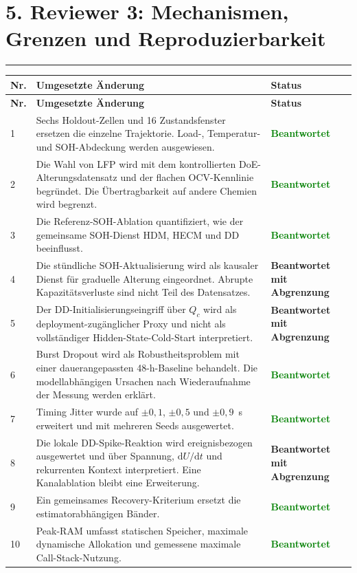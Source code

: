 \documentclass[10pt,a4paper]{article}
\newcommand{\statusdone}{\textcolor{green}{\textbf{Beantwortet}}}
\newcommand{\statusscope}{\textcolor{tured}{\textbf{Beantwortet mit Abgrenzung}}}
\newcommand{\sectionrule}{\vspace{-2pt}\color{tured}\rule{\textwidth}{0.7pt}\color{black}\vspace{2pt}}
\begin{document}
\section*{5. Reviewer 3: Mechanismen, Grenzen und Reproduzierbarkeit}
\sectionrule

\small
\begin{longtable}{P{0.8cm}P{10.5cm}P{3.4cm}}
\toprule
\textbf{Nr.} & \textbf{Umgesetzte Änderung} & \textbf{Status} \\
\midrule
\endfirsthead
\toprule
\textbf{Nr.} & \textbf{Umgesetzte Änderung} & \textbf{Status} \\
\midrule
{} & Sechs Holdout-Zellen und 16 Zustandsfenster ersetzen die einzelne Trajektorie. Load-, Temperatur- und SOH-Abdeckung werden ausgewiesen. & \statusdone \\
2 & Die Wahl von LFP wird mit dem kontrollierten DoE-Alterungsdatensatz und der flachen OCV-Kennlinie begründet. Die Übertragbarkeit auf andere Chemien wird begrenzt. & \statusdone \\
3 & Die Referenz-SOH-Ablation quantifiziert, wie der gemeinsame SOH-Dienst HDM, HECM und DD beeinflusst. & \statusdone \\
4 & Die stündliche SOH-Aktualisierung wird als kausaler Dienst für graduelle Alterung eingeordnet. Abrupte Kapazitätsverluste sind nicht Teil des Datensatzes. & \statusscope \\
5 & Der DD-Initialisierungseingriff über $Q_c$ wird als deployment-zugänglicher Proxy und nicht als vollständiger Hidden-State-Cold-Start interpretiert. & \statusscope \\
6 & Burst Dropout wird als Robustheitsproblem mit einer dauerangepassten 48-h-Baseline behandelt. Die modellabhängigen Ursachen nach Wiederaufnahme der Messung werden erklärt. & \statusdone \\
7 & Timing Jitter wurde auf $\pm0{,}1$, $\pm0{,}5$ und $\pm0{,}9$~s erweitert und mit mehreren Seeds ausgewertet. & \statusdone \\
8 & Die lokale DD-Spike-Reaktion wird ereignisbezogen ausgewertet und über Spannung, $\mathrm{d}U/\mathrm{d}t$ und rekurrenten Kontext interpretiert. Eine Kanalablation bleibt eine Erweiterung. & \statusscope \\
9 & Ein gemeinsames Recovery-Kriterium ersetzt die estimatorabhängigen Bänder. & \statusdone \\
10 & Peak-RAM umfasst statischen Speicher, maximale dynamische Allokation und gemessene maximale Call-Stack-Nutzung. & \statusdone \\

\end{longtable}
\end{document}

